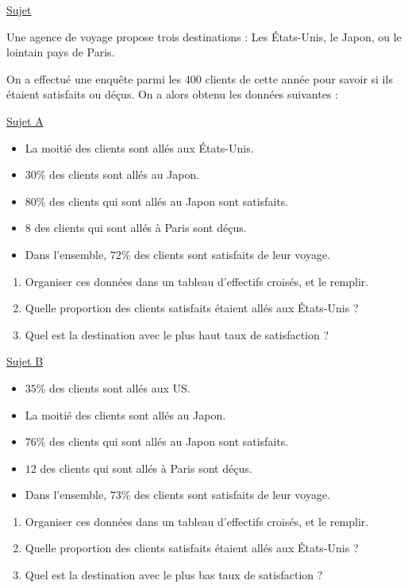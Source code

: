 \documentclass[headerTitle=Interrogation]{exercice}
\begin{document}
{\color{red}
\uline{Sujet}}\medskip

Une agence de voyage propose trois destinations : Les États-Unis, le Japon, ou le lointain pays de Paris.

On a effectué une enquête parmi les $400$ clients de cette année pour savoir si ils étaient satisfaits ou déçus. On a alors obtenu les données suivantes :
\begin{multicols}{2}
	\uline{Sujet A}

	\begin{itemize}
		\item La moitié des clients sont allés aux États-Unis.
		\item $30$\% des clients sont allés au Japon.
		\item $80$\% des clients qui sont allés au Japon sont satisfaits.
		\item $8$ des clients qui sont allés à Paris sont déçus.
		\item Dans l'ensemble, $72$\% des clients sont satisfaits de leur voyage.
	\end{itemize}

	\begin{enumerate}
		\item Organiser ces données dans un tableau d'effectifs croisés, et le remplir.
		\item Quelle proportion des clients satisfaits étaient allés aux États-Unis ?
		\item Quel est la destination avec le plus haut taux de satisfaction ?
	\end{enumerate}

	\columnbreak

	\uline{Sujet B}

	\begin{itemize}
		\item $35$\% des clients sont allés aux US.
		\item La moitié des clients sont allés au Japon.
		\item $76$\% des clients qui sont allés au Japon sont satisfaits.
		\item $12$ des clients qui sont allés à Paris sont déçus.
		\item Dans l'ensemble, $73$\% des clients sont satisfaits de leur voyage.
	\end{itemize}

	\begin{enumerate}
		\item Organiser ces données dans un tableau d'effectifs croisés, et le remplir.
		\item Quelle proportion des clients satisfaits étaient allés aux États-Unis ?
		\item Quel est la destination avec le plus bas taux de satisfaction ?
	\end{enumerate}
\end{multicols}
\end{document}
